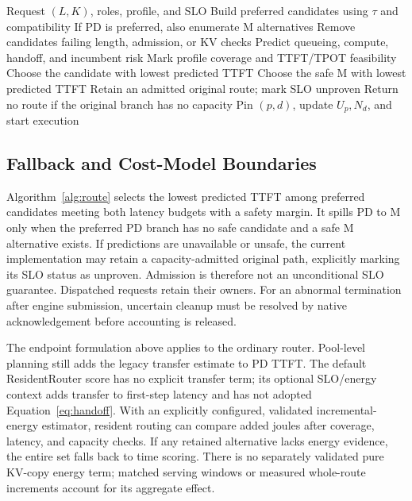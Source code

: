 \documentclass[11pt,a4paper,twocolumn]{article}
\begin{document}
\begin{algorithm}[t]
\caption{Request assignment in the ordinary router}
\label{alg:route}
\small
\begin{algorithmic}[1]
\Require Request $(L,K)$, roles, profile, and SLO
\State Build preferred candidates using $\tau$ and compatibility
\State If PD is preferred, also enumerate M alternatives
\State Remove candidates failing length, admission, or KV checks
  \State Predict queueing, compute, handoff, and incumbent risk
  \State Mark profile coverage and TTFT/TPOT feasibility
\EndFor
{}
  \State Choose the candidate with lowest predicted TTFT
  \State Choose the safe M with lowest predicted TTFT
\Else
  \State Retain an admitted original route; mark SLO unproven
  \State Return no route if the original branch has no capacity
\EndIf
\State Pin $(p,d)$, update $U_p,N_d$, and start execution
\end{algorithmic}
\end{algorithm}

\subsection{Fallback and Cost-Model Boundaries}

Algorithm~\ref{alg:route} selects the lowest predicted TTFT
among preferred candidates meeting both latency budgets with
a safety margin. It spills PD to M only when the preferred
PD branch has no safe candidate and a safe M alternative
exists. If predictions are unavailable or unsafe, the current
implementation may retain a capacity-admitted original path,
explicitly marking its SLO status as unproven. Admission is
therefore not an unconditional SLO guarantee. Dispatched
requests retain their owners. For an abnormal termination
after engine submission, uncertain cleanup must be resolved
by native acknowledgement before accounting is released.

The endpoint formulation above applies to the ordinary
router. Pool-level planning still adds the legacy transfer
estimate to PD TTFT. The default ResidentRouter score has no
explicit transfer term; its optional SLO/energy context adds
transfer to first-step latency and has not adopted
Equation~\eqref{eq:handoff}. With an explicitly configured,
validated incremental-energy estimator, resident routing
can compare added joules after coverage, latency, and
capacity checks. If any retained alternative lacks energy
evidence, the entire set falls back to time scoring.
There is no separately validated pure KV-copy energy term;
matched serving windows or measured whole-route increments
account for its aggregate effect.
\end{document}
